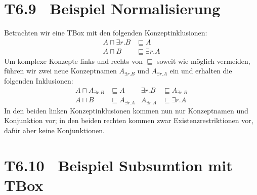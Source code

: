 \documentclass[fontsize=11pt, twoside=false, numbers=autoenddot]{scrbook}
\begin{document}
\pagebreak
\section*{T6.9~ Beispiel Normalisierung}

Betrachten wir eine TBox mit den folgenden Konzeptinklusionen: 
%
\begin{align*}
  A\sqcap \exists r.B & \sqsubseteq A \\
  A\sqcap B & \sqsubseteq \exists r.A 
\end{align*}
%
Um komplexe Konzepte links und rechts von $\sqsubseteq$ soweit
wie möglich vermeiden, führen wir zwei neue Konzeptnamen $A_{\exists
r.B}$ und $A_{\exists r.A}$ ein und erhalten die folgenden Inklusionen: 
%
\begin{align*}
  A\sqcap A_{\exists r.B} & \sqsubseteq A  & \exists r.B &
  \sqsubseteq A_{\exists r.B} \\
  A\sqcap B & \sqsubseteq A_{\exists r.A} & A_{\exists r.A} &\sqsubseteq
  \exists r.A
\end{align*}
%
In den beiden linken Konzeptinklusionen kommen nun nur Konzeptnamen
und Konjunktion vor; in den beiden rechten kommen zwar
Existenzrestriktionen vor, dafür aber keine Konjunktionen.

\section*{T6.10~ Beispiel Subsumtion mit TBox}
\end{document}
